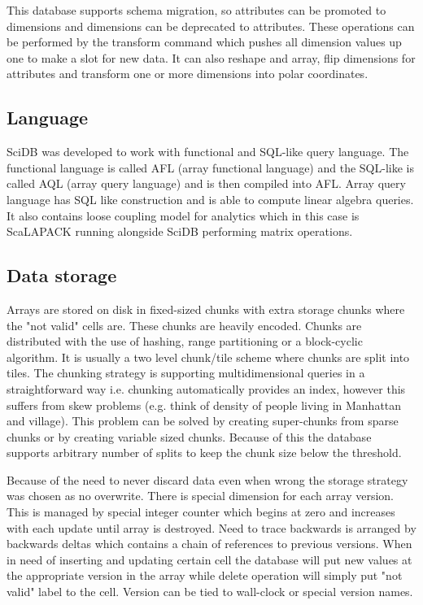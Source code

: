 This database supports schema migration, so attributes can be promoted to dimensions and dimensions can be deprecated to attributes. These operations can be performed by the transform command which pushes all dimension values up one to make a slot for new data. It can also reshape and array, flip dimensions for attributes and transform one or more dimensions into polar coordinates.

\subsection{Language}

SciDB was developed to work with functional and SQL-like query language. The functional language is called AFL (array functional language) and the SQL-like is called AQL (array query language) and is then compiled into AFL. Array query language has SQL like construction and is able to compute linear algebra queries. It also contains loose coupling model for analytics which in this case is ScaLAPACK running alongside SciDB performing matrix operations.

\subsection{Data storage}
Arrays are stored on disk in fixed-sized chunks with extra storage chunks where the "not valid" cells are. These chunks are heavily encoded. Chunks are distributed with the use of hashing, range partitioning or a block-cyclic algorithm. It is usually a two level chunk/tile scheme where chunks are split into tiles. The chunking strategy is supporting multidimensional queries in a straightforward way i.e. chunking automatically provides an index, however this suffers from skew problems (e.g. think of density of people living in Manhattan and village). This problem can be solved by creating super-chunks from sparse chunks or by creating variable sized chunks. Because of this the database supports arbitrary number of splits to keep the chunk size below the threshold.

Because of the need to never discard data even when wrong the storage strategy was chosen as no overwrite. There is special dimension for each array version. This is managed by special integer counter which begins at zero and increases with each update until array is destroyed. Need to trace backwards is arranged by backwards deltas which contains a chain of references to previous versions. When in need of inserting and updating certain cell the database will put new values at the appropriate version in the array while delete operation will simply put "not valid" label to the cell. Version can be tied to wall-clock or special version names.

